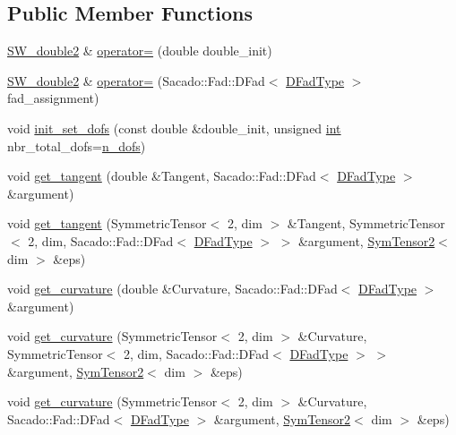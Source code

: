 \subsection*{Public Member Functions}
\begin{DoxyCompactItemize}
\item 
\hyperlink{classSacado__Wrapper_1_1SW__double2}{S\+W\+\_\+double2} \& \hyperlink{classSacado__Wrapper_1_1SW__double2_a6f0538f891bd49efa54cc508da477f2e}{operator=} (double double\+\_\+init)
\item 
\hyperlink{classSacado__Wrapper_1_1SW__double2}{S\+W\+\_\+double2} \& \hyperlink{classSacado__Wrapper_1_1SW__double2_a426ab490411a347540e5af7028638495}{operator=} (Sacado\+::\+Fad\+::\+D\+Fad$<$ \hyperlink{Sacado__Wrapper_8h_a7e0893207b87dad05c66a34baac8ed2e}{D\+Fad\+Type} $>$ fad\+\_\+assignment)
\item 
void \hyperlink{classSacado__Wrapper_1_1SW__double2_af633ef0195198f1fed2bb44106af33c5}{init\+\_\+set\+\_\+dofs} (const double \&double\+\_\+init, unsigned \hyperlink{CMakeCache_8txt_a79a3d8790b2588b09777910863574e09}{int} nbr\+\_\+total\+\_\+dofs=\hyperlink{classSacado__Wrapper_1_1SW__double2_a535aa77392e896e21151bfc63f92e020}{n\+\_\+dofs})
\item 
void \hyperlink{classSacado__Wrapper_1_1SW__double2_ad51ba1e79171d60861b28098dfef903d}{get\+\_\+tangent} (double \&Tangent, Sacado\+::\+Fad\+::\+D\+Fad$<$ \hyperlink{Sacado__Wrapper_8h_a7e0893207b87dad05c66a34baac8ed2e}{D\+Fad\+Type} $>$ \&argument)
\item 
void \hyperlink{classSacado__Wrapper_1_1SW__double2_a9ee087929024da3da05268d5d0d4964b}{get\+\_\+tangent} (Symmetric\+Tensor$<$ 2, dim $>$ \&Tangent, Symmetric\+Tensor$<$ 2, dim, Sacado\+::\+Fad\+::\+D\+Fad$<$ \hyperlink{Sacado__Wrapper_8h_a7e0893207b87dad05c66a34baac8ed2e}{D\+Fad\+Type} $>$ $>$ \&argument, \hyperlink{classSacado__Wrapper_1_1SymTensor2}{Sym\+Tensor2}$<$ dim $>$ \&eps)
\item 
void \hyperlink{classSacado__Wrapper_1_1SW__double2_a7d3f3a21cd842645af9861bf50308825}{get\+\_\+curvature} (double \&Curvature, Sacado\+::\+Fad\+::\+D\+Fad$<$ \hyperlink{Sacado__Wrapper_8h_a7e0893207b87dad05c66a34baac8ed2e}{D\+Fad\+Type} $>$ \&argument)
\item 
void \hyperlink{classSacado__Wrapper_1_1SW__double2_a21da9eedb0c0e0d7db441426a5519a1a}{get\+\_\+curvature} (Symmetric\+Tensor$<$ 2, dim $>$ \&Curvature, Symmetric\+Tensor$<$ 2, dim, Sacado\+::\+Fad\+::\+D\+Fad$<$ \hyperlink{Sacado__Wrapper_8h_a7e0893207b87dad05c66a34baac8ed2e}{D\+Fad\+Type} $>$ $>$ \&argument, \hyperlink{classSacado__Wrapper_1_1SymTensor2}{Sym\+Tensor2}$<$ dim $>$ \&eps)
\item 
void \hyperlink{classSacado__Wrapper_1_1SW__double2_ac99cef52c5af3c6516aecf940275c595}{get\+\_\+curvature} (Symmetric\+Tensor$<$ 2, dim $>$ \&Curvature, Sacado\+::\+Fad\+::\+D\+Fad$<$ \hyperlink{Sacado__Wrapper_8h_a7e0893207b87dad05c66a34baac8ed2e}{D\+Fad\+Type} $>$ \&argument, \hyperlink{classSacado__Wrapper_1_1SymTensor2}{Sym\+Tensor2}$<$ dim $>$ \&eps)
\end{DoxyCompactItemize}
